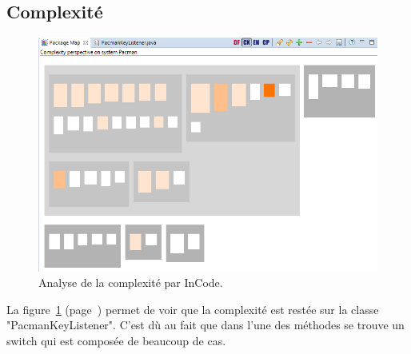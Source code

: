 \documentclass[12pt,a4paper,final]{article}
\newcommand{\labelfigure}[1]{figure~\ref{#1} (page~\pageref{#1})}
\begin{document}
\subsection{Complexité}
\begin{figure}[!h]
	\centering
	\includegraphics[width=\textwidth]{InCodeComplexity_refactor.png}
	\caption{\label{complexity_refact}Analyse de la complexité par InCode.}
\end{figure}
La \labelfigure{complexity_refact} permet de voir que la complexité est restée sur la classe "PacmanKeyListener". C'est dù au fait que dans l'une des méthodes se trouve un switch qui est composée de beaucoup de cas.

\end{document}
